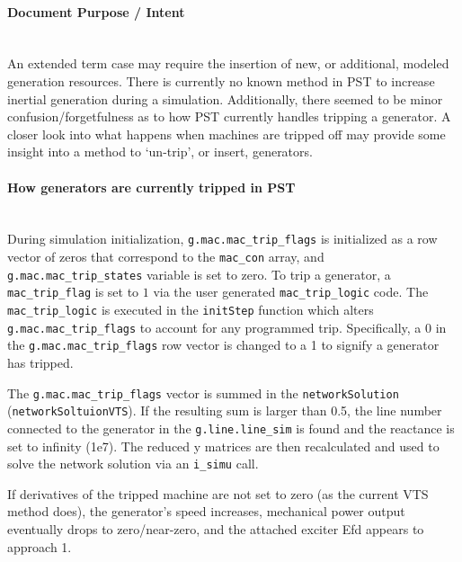 \documentclass[12pt]{article}
\begin{document}
\onehalfspacing
\paragraph{Document Purpose / Intent} \ \\
An extended term case may require the insertion of new, or additional, modeled generation resources.
There is currently no known method in PST to increase inertial generation during a simulation.
Additionally, there seemed to be minor confusion/forgetfulness as to how PST currently handles tripping a generator.
A closer look into what happens when machines are tripped off may provide some insight into a method to `un-trip', or insert, generators.


\paragraph{How generators are currently tripped in PST} \ \\
During simulation initialization, \verb|g.mac.mac_trip_flags| is initialized as a row vector of zeros that correspond to the \verb|mac_con| array, and 
\verb|g.mac.mac_trip_states| variable is set to zero. %
To trip a generator, a \verb|mac_trip_flag| is set to $1$ via the user generated \verb|mac_trip_logic| code.
The \verb|mac_trip_logic| is executed in the \verb|initStep| function which alters \verb|g.mac.mac_trip_flags| to account for any programmed trip.
Specifically, a $0$ in the \verb|g.mac.mac_trip_flags| row vector is changed to a 1 to signify a generator has tripped.

The \verb|g.mac.mac_trip_flags| vector is summed in the \verb|networkSolution| (\verb|networkSoltuionVTS|).
If the resulting sum is larger than 0.5, the line number connected to the generator in the \verb|g.line.line_sim| is found and the reactance is set to infinity (1e7).
The reduced y matrices are then recalculated and used to solve the network solution via an \verb|i_simu| call.

If derivatives of the tripped machine are not set to zero (as the current VTS method does), the generator's speed increases, mechanical power output eventually drops to zero/near-zero, and the attached exciter Efd appears to approach 1.
\end{document}
